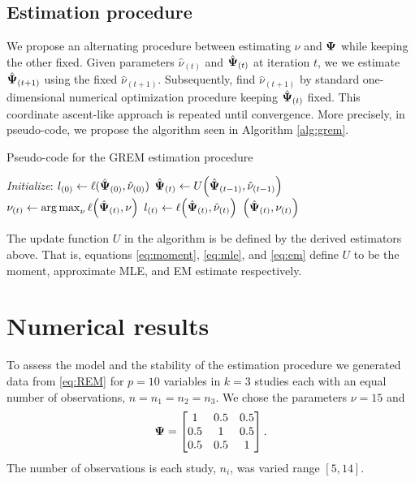 \documentclass{article}\usepackage[]{graphicx}\usepackage[]{color}
\begin{document}
\subsection{Estimation procedure}
We propose an alternating procedure between estimating $\nu$ and ${\boldsymbol{\Psi}}$ while keeping the other fixed.
Given parameters $\hat{\nu}_{(t)}$ and ${\hat{\boldsymbol{\Psi}}}_{(t)}$ at iteration $t$, we we estimate ${\hat{\boldsymbol{\Psi}}}_{(t+1)}$ using the fixed $\hat{\nu}_{(t+1)}$. Subsequently, find $\hat{\nu}_{(t+1)}$ by standard one-dimensional numerical optimization procedure keeping ${\hat{\boldsymbol{\Psi}}}_{(t)}$ fixed.
This coordinate ascent-like approach is repeated until convergence.
More precisely, in pseudo-code, we propose the algorithm seen in Algorithm \ref{alg:grem}.
\begin{algorithm}
\caption{Pseudo-code for the GREM estimation procedure}\label{alg:grem}
\begin{algorithmic}[1]
\State {}
\State {}
\State
\State \emph{Initialize}: $l_{(0)} \gets \ell({\hat{\boldsymbol{\Psi}}}_{(0)}, \hat{\nu}_{(0)})$
  \State ${\hat{\boldsymbol{\Psi}}}_{(t)} \gets U\!\left({\hat{\boldsymbol{\Psi}}}_{(t-1)}, \hat{\nu}_{(t-1)}\right)$
  \State $\nu_{(t)} \gets \operatorname*{arg\,max}_\nu \ell\!\left({\hat{\boldsymbol{\Psi}}}_{(t)}, \nu\right)$
  \State $l_{(t)} \gets \ell\!\left({\hat{\boldsymbol{\Psi}}}_{(t)}, \hat{\nu}_{(t)}\right)$
      \State \Return $\left({\hat{\boldsymbol{\Psi}}}_{(t)}, \nu_{(t)}\right)$
    \EndIf
 \EndFor
\EndProcedure
\end{algorithmic}
\end{algorithm}
The update function $U$ in the algorithm is be defined by the derived estimators above. That is, equations \eqref{eq:moment}, \eqref{eq:mle}, and \eqref{eq:em} define $U$ to be the moment, approximate MLE, and EM estimate respectively.

\section{Numerical results}


To assess the model and the stability of the estimation procedure we generated data from \eqref{eq:REM} for $p = 10$ variables in $k = 3$ studies each with an equal number of observations, $n = n_1 = n_2 = n_3$. We chose the parameters $\nu = 15$ and
\begin{align*}
{\boldsymbol{\Psi}} =
  \begin{bmatrix}
     1 & 0.5 & 0.5 \\
     0.5 & 1 & 0.5 \\
     0.5 & 0.5 & 1 \\
  \end{bmatrix}.
\end{align*}
The number of observations is each study, $n_i$, was varied range $[5,14]$.
\end{document}
